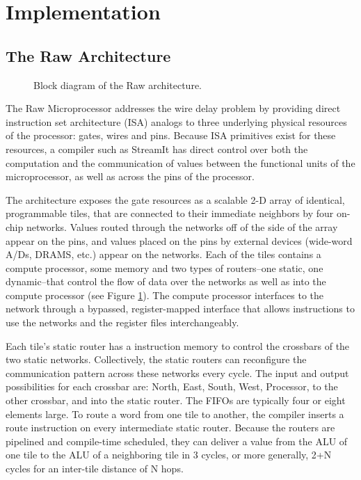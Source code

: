 \section{Implementation}



\subsection{The Raw Architecture}
\label{sec:raw}

\begin{figure}
\centering
{}
\caption{Block diagram of the Raw architecture.
\protect\label{fig:raw-diagram}}
\end{figure}


The Raw Microprocessor \cite{raw10,raw} addresses the wire delay
problem \cite{raw13} by providing direct instruction set architecture
(ISA) analogs to three underlying physical resources of the processor:
gates, wires and pins. Because ISA primitives exist for these
resources, a compiler such as StreamIt has direct control over both
the computation and the communication of values between the functional
units of the microprocessor, as well as across the pins of the
processor.

The architecture exposes the gate resources as a scalable 2-D array of
identical, programmable tiles, that are connected to their immediate
neighbors by four on-chip networks.  Values routed through the
networks off of the side of the array appear on the pins, and values
placed on the pins by external devices (wide-word A/Ds, DRAMS, etc.)
appear on the networks.  Each of the tiles contains a compute
processor, some memory and two types of routers--one static, one
dynamic--that control the flow of data over the networks as well as
into the compute processor (see Figure \ref{fig:raw-diagram}).  The
compute processor interfaces to the network through a bypassed,
register-mapped interface \cite{raw10} that allows instructions to use
the networks and the register files interchangeably.

Each tile's static router has a instruction memory to control the
crossbars of the two static networks. Collectively, the static routers
can reconfigure the communication pattern across these networks every
cycle.  The input and output possibilities for each crossbar are:
North, East, South, West, Processor, to the other crossbar, and into
the static router. The FIFOs are typically four or eight elements
large.  To route a word from one tile to another, the compiler inserts
a route instruction on every intermediate static router.  Because the
routers are pipelined and compile-time scheduled, they can deliver a
value from the ALU of one tile to the ALU of a neighboring tile in 3
cycles, or more generally, 2+N cycles for an inter-tile distance of N
hops.

